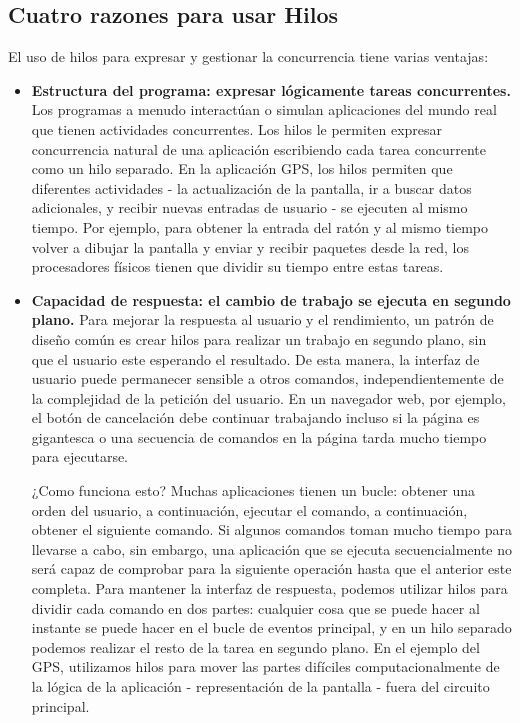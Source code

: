 \documentclass[10pt]{book}
\begin{document}
\subsection{Cuatro razones para usar Hilos}
El uso de hilos para expresar y gestionar la concurrencia tiene varias ventajas:
\begin{itemize}
\item \textbf{Estructura del programa: expresar lógicamente tareas concurrentes.} Los programas a menudo interactúan o simulan aplicaciones del mundo real que tienen actividades concurrentes. Los hilos le permiten expresar concurrencia natural de una aplicación escribiendo cada tarea concurrente como un hilo separado. En la aplicación GPS, los hilos permiten que diferentes actividades - la actualización de la pantalla, ir a buscar datos adicionales, y recibir nuevas entradas de usuario - se ejecuten al mismo tiempo. Por ejemplo, para obtener la entrada del ratón y al mismo tiempo volver a dibujar la pantalla y enviar y recibir paquetes desde la red, los procesadores físicos tienen que dividir su tiempo entre estas tareas.

\item \textbf{Capacidad de respuesta: el cambio de trabajo se ejecuta en segundo plano.} Para mejorar la respuesta al usuario y el rendimiento, un patrón de diseño común es crear hilos para realizar un trabajo en segundo plano, sin que el usuario este esperando el resultado. De esta manera, la interfaz de usuario puede permanecer sensible a otros comandos, independientemente de la complejidad de la petición del usuario. En un navegador web, por ejemplo, el botón de cancelación debe continuar trabajando incluso si la página es gigantesca o una secuencia de comandos en la página tarda mucho tiempo para ejecutarse.

¿Como funciona esto? Muchas aplicaciones tienen un bucle: obtener una orden del usuario, a continuación, ejecutar el comando, a continuación, obtener el siguiente comando. Si algunos comandos toman mucho tiempo para llevarse a cabo, sin embargo, una aplicación que se ejecuta secuencialmente no será capaz de comprobar para la siguiente operación hasta que el anterior este completa. Para mantener la interfaz de respuesta, podemos utilizar hilos para dividir cada comando en dos partes: cualquier cosa que se puede hacer al instante se puede hacer en el bucle de eventos principal, y en un hilo separado podemos realizar el resto de la tarea en segundo plano. En el ejemplo del GPS, utilizamos hilos para mover las partes difíciles computacionalmente de la lógica de la aplicación - representación de la pantalla - fuera del circuito principal.


\end{itemize}
\end{document}
